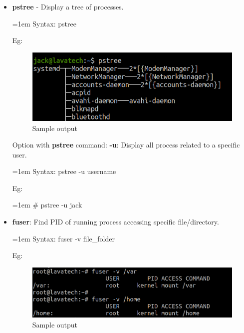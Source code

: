 \begin{flushleft}
\begin{itemize}
\begin{itemize}
		\end{itemize}
	
	\newpage
	\item \textbf{pstree} - Display a tree of processes.
	\bigskip
	\begin{tcolorbox}[breakable,notitle,boxrule=-0pt,colback=pink,colframe=pink]
		\color{black}
		\font=1em
		Syntax: pstree
		\font=4pt
	\end{tcolorbox}
	
	Eg:
	\begin{figure}[h!]
		\centering
		\includegraphics[scale=.4]{content/chapter12/images/pstree.png}
		\caption{Sample output}
		\label{fig:process2345492}
	\end{figure}
	Option with \textbf{pstree} command:
	\newline
	\textbf{-u}: Display all process related to a specific user.
	\bigskip
	\begin{tcolorbox}[breakable,notitle,boxrule=-0pt,colback=pink,colframe=pink]
		\color{black}
		\font=1em
		Syntax: pstree -u username
		\font=4pt
	\end{tcolorbox}
	
	Eg:
	\begin{tcolorbox}[breakable,notitle,boxrule=-0pt,colback=black,colframe=black]
		\color{green}
		\font=1em
		\# pstree -u jack
		\font=4pt
	\end{tcolorbox}
	
	
	\bigskip
	\bigskip
	
	\item \textbf{fuser}: Find PID of running process accessing specific file/directory.
	\bigskip
	\begin{tcolorbox}[breakable,notitle,boxrule=-0pt,colback=pink,colframe=pink]
		\color{black}
		\font=1em
		Syntax: fuser -v file\_folder
		\font=4pt
	\end{tcolorbox}

	Eg:
	\begin{figure}[h!]
		\centering
		\includegraphics[scale=.4]{content/chapter12/images/fuser.png}
		\caption{Sample output}
		\label{fig:process2345492}
	\end{figure}
	

\end{itemize}
\end{flushleft}
